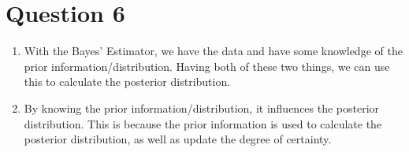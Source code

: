 \documentclass{article}
\begin{document}
\section*{Question 6}
\begin{enumerate}
   \item With the Bayes’ Estimator, we have the data and have some knowledge of the prior information/distribution. Having both of these two things, we can use this to calculate the posterior distribution. 
   \item By knowing the prior information/distribution, it influences the posterior distribution. This is because the prior information is used to calculate the posterior distribution, as well as update the degree of certainty. 
\end{enumerate}
\end{document}
